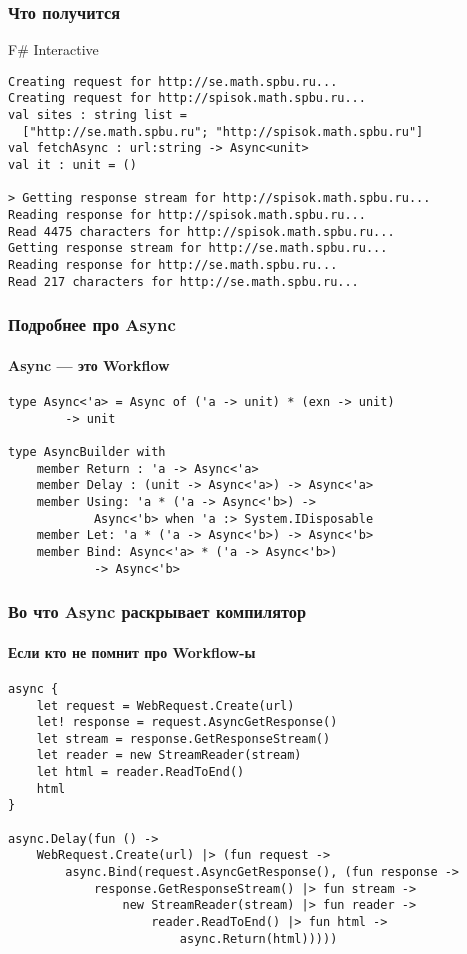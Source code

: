 \documentclass[xetex,mathserif,serif]{beamer}
\begin{document}
	\begin{frame}[fragile]
		\frametitle{Что получится}
		\begin{alertblock}{F\# Interactive}
			\begin{verbatim}
Creating request for http://se.math.spbu.ru...
Creating request for http://spisok.math.spbu.ru...
val sites : string list =
  ["http://se.math.spbu.ru"; "http://spisok.math.spbu.ru"]
val fetchAsync : url:string -> Async<unit>
val it : unit = ()

> Getting response stream for http://spisok.math.spbu.ru...
Reading response for http://spisok.math.spbu.ru...
Read 4475 characters for http://spisok.math.spbu.ru...
Getting response stream for http://se.math.spbu.ru...
Reading response for http://se.math.spbu.ru...
Read 217 characters for http://se.math.spbu.ru...
			\end{verbatim}
		\end{alertblock}
\end{frame}

	\begin{frame}[fragile]
		\frametitle{Подробнее про Async}
		\framesubtitle{Async --- это Workflow}
		\begin{verbatim}
type Async<'a> = Async of ('a -> unit) * (exn -> unit) 
        -> unit

type AsyncBuilder with
    member Return : 'a -> Async<'a>
    member Delay : (unit -> Async<'a>) -> Async<'a>
    member Using: 'a * ('a -> Async<'b>) -> 
            Async<'b> when 'a :> System.IDisposable
    member Let: 'a * ('a -> Async<'b>) -> Async<'b>
    member Bind: Async<'a> * ('a -> Async<'b>) 
            -> Async<'b>
		\end{verbatim}
\end{frame}

	\begin{frame}[fragile]
		\frametitle{Во что Async раскрывает компилятор}
		\framesubtitle{Если кто не помнит про Workflow-ы}
		\begin{footnotesize}
			\begin{verbatim}
async { 
    let request = WebRequest.Create(url)
    let! response = request.AsyncGetResponse()
    let stream = response.GetResponseStream()
    let reader = new StreamReader(stream)
    let html = reader.ReadToEnd()
    html
} 

async.Delay(fun () ->
    WebRequest.Create(url) |> (fun request ->
        async.Bind(request.AsyncGetResponse(), (fun response ->
            response.GetResponseStream() |> fun stream ->
                new StreamReader(stream) |> fun reader ->
                    reader.ReadToEnd() |> fun html ->
                        async.Return(html)))))
			\end{verbatim}
		\end{footnotesize}
\end{frame}
\end{document}
